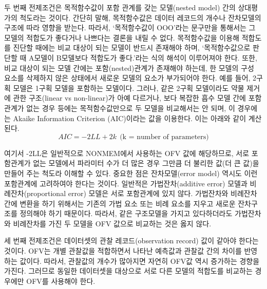 \documentclass[
  10pt,
  krantz2,
  a4paper]{krantz}
\theoremstyle{definition}
\theoremstyle{definition}
\theoremstyle{definition}
\theoremstyle{remark}
\begin{document}
두 번째 전제조건은 목적함수값이 포함 관계를 갖는 모델(nested model) 간의 상대평가의 척도라는 것이다. 간단히 말해, 목적함수값은 데이터 레코드의 개수나 잔차모델의 구조에 따라 영향을 받는다. 따라서, `목적함수값이 OOO'라는 문구만을 통해서는 그 모델의 적합도가 좋다거나 나쁘다는 결론을 내릴 수 없다. 목적함수값을 이용해 적합도를 진단할 때에는 비교 대상이 되는 모델이 반드시 존재해야 하며, `목적함수값으로 판단할 때 A모델이 B모델보다 적합도가 좋다.'라는 식의 해석이 이루어져야 한다. 또한, 비교 대상이 되는 모델 간에는 포함(nested)관계가 존재해야 하는데, 한 모델의 구성 요소를 삭제하지 않은 상태에서 새로운 모델의 요소가 부가되어야 한다. 예를 들어, 2구획 모델은 1구획 모델을 포함하는 모델이다. 그러나, 같은 2구획 모델이라도 약물 제거에 관한 구조(linear vs non-linear)가 아예 다르거나, 보다 복잡한 흡수 모델 간에 포함 관계가 없는 경우 등에는 목적함수값만으로 두 모델을 비교해서는 안 되며, 이 경우에는 Akaike Information Criterion (AIC)이라는 값을 이용한다. 이는 아래와 같이 계산된다.
\begin{equation}
AIC = -2LL + 2k \ \ \text{(k = number of parameters)}
\label{eq:aic}
\end{equation}

여기서 -2LL은 일반적으로 NONMEM에서 사용하는 OFV 값에 해당하므로, 서로 포함관계가 없는 모델에서 파라미터 수가 더 많은 경우 그만큼 더 불리한 값(더 큰 값)을 만들어 주는 척도라 이해할 수 있다. 중요한 점은 잔차모델(error model) 역시도 이런 포함관계에 고려하여야 한다는 것이다. 일반적은 가법잔차(additive error) 모델과 비례잔차(proportional error) 모델은 서로 포함관계에 있지 않다. 가법잔차와 비례잔차 간에 변환을 하기 위해서는 기존의 가법 요소 또는 비례 요소를 지우고 새로운 잔차구조를 정의해야 하기 때문이다. 따라서, 같은 구조모델을 가지고 있다하더라도 가법잔차와 비례잔차를 가진 두 모델을 OFV 값으로 비교하는 것은 옳지 않다.

세 번째 전제조건은 데이터셋의 관찰 레코드(observation record) 값이 같아야 한다는 것이다. OFV는 개별 관찰값을 적합하면서 나타난 예측값과 관찰값 간의 차이를 반영하는 값이다. 따라서, 관찰값의 개수가 많아지면 자연히 OFV값 역시 증가하는 경향을 가진다. 그러므로 동일한 데이터셋을 대상으로 서로 다른 모델의 적합도를 비교하는 경우에만 OFV를 사용해야 한다.
\end{document}
